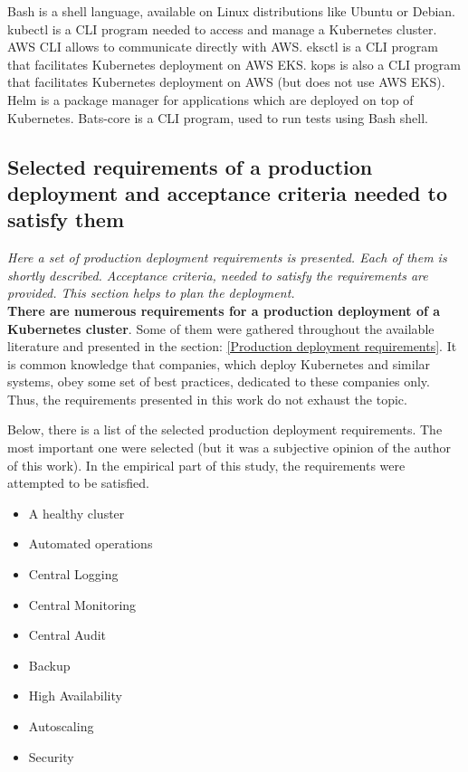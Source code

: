 Bash is a shell language, available on Linux distributions like Ubuntu or Debian. kubectl is a CLI program needed to access and manage a Kubernetes cluster\cite{kubectl}. AWS CLI allows to communicate directly with AWS. eksctl is a CLI program that facilitates Kubernetes deployment on AWS EKS\cite{eksctl}. kops is also a CLI program that facilitates Kubernetes deployment on AWS (but does not use AWS EKS)\cite{online-kops}. Helm is a package manager for applications which are deployed on top of Kubernetes\cite{helm}. Bats-core is a CLI program, used to run tests using Bash shell\cite{bats-core}.

\subsection{Selected requirements of a production deployment and acceptance criteria needed to satisfy them}
\textit{Here a set of production deployment requirements is presented. Each of them is shortly described. Acceptance criteria, needed to satisfy the requirements are provided. This section helps to plan the deployment.}
\\

\textbf{There are numerous requirements for a production deployment of a Kubernetes cluster}. Some of them were gathered throughout the available literature and presented in the section: \ref{Production deployment requirements}. It is common knowledge that companies, which deploy Kubernetes and similar systems, obey some set of best practices, dedicated to these companies only. Thus, the requirements presented in this work do not exhaust the topic.

Below, there is a list of the selected production deployment requirements. The most important one were selected (but it was a subjective opinion of the author of this work). In the empirical part of this study, the requirements were  attempted to be satisfied.
\begin{itemize}
\item A healthy cluster
\item Automated operations
\item Central Logging
\item Central Monitoring
\item Central Audit
\item Backup
\item High Availability
\item Autoscaling
\item Security
\end{itemize}

